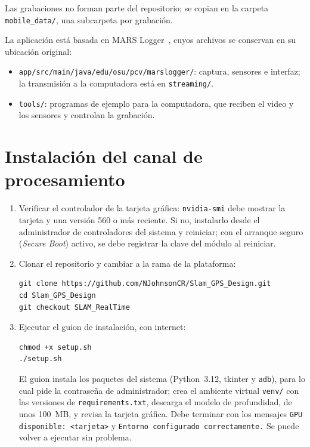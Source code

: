 Las grabaciones no forman parte del repositorio; se copian en la carpeta \texttt{mobile\_data/}, una subcarpeta por grabación.

La aplicación está basada en MARS Logger~\cite{huai2019mars,marslogger_repo}, cuyos archivos se conservan en su ubicación original:

\begin{itemize}
\item \texttt{app/src/main/java/edu/osu/pcv/marslogger/}: captura, sensores e interfaz; la transmisión a la computadora está en \texttt{streaming/}.
\item \texttt{tools/}: programas de ejemplo para la computadora, que reciben el video y los sensores y controlan la grabación.
\end{itemize}

\section{Instalación del canal de procesamiento}

\begin{enumerate}
\item Verificar el controlador de la tarjeta gráfica: \texttt{nvidia-smi} debe mostrar la tarjeta y una versión 560 o más reciente.
Si no, instalarlo desde el administrador de controladores del sistema y reiniciar; con el arranque seguro (\textit{Secure Boot}) activo, se debe registrar la clave del módulo al reiniciar.

\item Clonar el repositorio y cambiar a la rama de la plataforma:
\begin{small}
\begin{verbatim}
git clone https://github.com/NJohnsonCR/Slam_GPS_Design.git
cd Slam_GPS_Design
git checkout SLAM_RealTime
\end{verbatim}
\end{small}

\item Ejecutar el guion de instalación, con internet:
\begin{small}
\begin{verbatim}
chmod +x setup.sh
./setup.sh
\end{verbatim}
\end{small}
El guion instala los paquetes del sistema (Python~3.12, tkinter y \texttt{adb}), para lo cual pide la contraseña de administrador; crea el ambiente virtual \texttt{venv/} con las versiones de \texttt{requirements.txt}, descarga el modelo de profundidad, de unos 100~MB, y revisa la tarjeta gráfica.
Debe terminar con los mensajes \texttt{GPU disponible: <tarjeta>} y \texttt{Entorno configurado correctamente.}
Se puede volver a ejecutar sin problema.
\end{enumerate}

